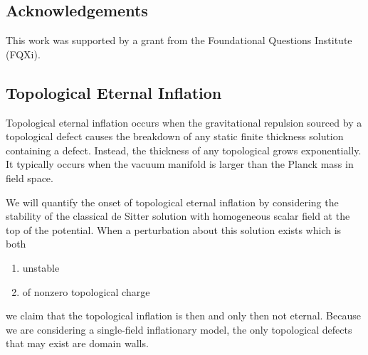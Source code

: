 \documentclass[aps,amsfonts,amsmath,prd,preprint,nofootinbib,superscriptaddress]{revtex4}
\begin{document}
\subsection*{Acknowledgements}
This work was supported by a grant from the Foundational Questions Institute (FQXi).




\begin{appendix}










\section{Topological Eternal Inflation}\label{sec:topo}
Topological eternal inflation \cite{Vilenkin:1994pv,Linde:1994wt} occurs when the gravitational repulsion sourced by a topological defect causes the breakdown of any static finite thickness solution containing a defect.  Instead, 
the thickness of any topological grows exponentially.  It typically \cite{Sakai:2003st}
occurs when the vacuum manifold is larger than the Planck mass in field space.  

We will quantify the onset of topological eternal inflation by considering the stability of the classical de Sitter solution with homogeneous scalar field at the top of the potential.  When a perturbation about this
solution exists which is both
\begin{enumerate}
\item unstable
\item of nonzero topological charge
 \end{enumerate}
 we claim that the topological inflation is then and only then not eternal.
Because we are considering a single-field inflationary model, the only topological defects that may exist are domain walls.  %






\end{appendix}
\end{document}
